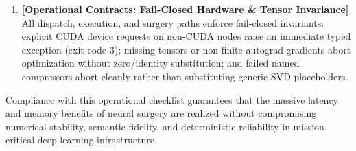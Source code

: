 \begin{enumerate}
    \item \textbf{[Operational Contracts: Fail-Closed Hardware \& Tensor Invariance]} All dispatch, execution, and surgery paths enforce fail-closed invariants: explicit CUDA device requests on non-CUDA nodes raise an immediate typed exception (exit code 3); missing tensors or non-finite autograd gradients abort optimization without zero/identity substitution; and failed named compressors abort cleanly rather than substituting generic SVD placeholders.
\end{enumerate}

Compliance with this operational checklist guarantees that the massive latency and memory benefits of neural surgery are realized without compromising numerical stability, semantic fidelity, and deterministic reliability in mission-critical deep learning infrastructure.
